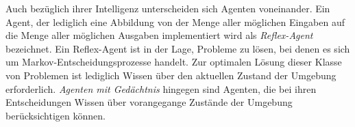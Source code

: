 \documentclass[a4paper]{scrartcl}
\newenvironment{Figure}
  {\par\medskip\noindent\minipage{\linewidth}}
  {\endminipage\par\medskip}
\begin{document}
\begin{multicols}{2}
\begin{Figure}
                \end{Figure}
                Auch bezüglich ihrer Intelligenz unterscheiden sich Agenten voneinander.
                Ein Agent, der lediglich eine Abbildung von der Menge aller möglichen Eingaben auf die Menge aller möglichen Ausgaben implementiert wird als \emph{Reflex-Agent} bezeichnet. Ein Reflex-Agent ist in der Lage, Probleme zu lösen, bei denen es sich um Markov-Entscheidungsprozesse handelt. Zur optimalen Lösung dieser Klasse von Problemen ist lediglich Wissen über den aktuellen Zustand der Umgebung erforderlich.
                \newline
                \emph{Agenten mit Gedächtnis} hingegen sind Agenten, die bei ihren Entscheidungen Wissen über vorangegange Zustände der Umgebung berücksichtigen können.
            

\end{multicols}
\end{document}
